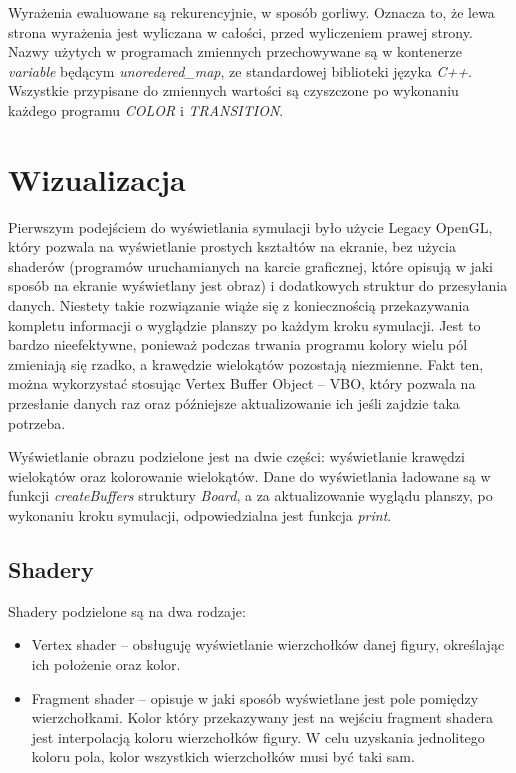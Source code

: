 \documentclass[declaration,shortabstract, inz]{iithesis}
\theoremstyle{definition} \newtheorem{definition}{Definicja}[]
\theoremstyle{plain} \newtheorem{remark}[definition]{Obserwacja}
\theoremstyle{plain} \newtheorem{theorem}[definition]{Twierdzenie}
\theoremstyle{plain} \newtheorem{example}{Przykład}[definition]
\theoremstyle{plain} \newtheorem{lemma}[definition]{Lemat}
\begin{document}
Wyrażenia ewaluowane są rekurencyjnie, w sposób gorliwy. Oznacza to, że lewa strona wyrażenia jest wyliczana w całości, przed wyliczeniem prawej strony. Nazwy użytych w programach zmiennych przechowywane są w kontenerze \textit{variable} będącym \textit{unoredered\_map}, ze standardowej biblioteki języka \textit{C++}. Wszystkie przypisane do zmiennych wartości są czyszczone po wykonaniu każdego programu \textit{COLOR} i \textit{TRANSITION}.

\chapter{Wizualizacja}
\label{sec:openGl}
Pierwszym podejściem do wyświetlania symulacji było użycie Legacy OpenGL, który pozwala na wyświetlanie prostych kształtów na ekranie, bez użycia shaderów (programów uruchamianych na karcie graficznej, które opisują w jaki sposób na ekranie wyświetlany jest obraz) i dodatkowych struktur do przesyłania danych. Niestety takie rozwiązanie wiąże się z koniecznością przekazywania kompletu informacji o wyglądzie planszy po każdym kroku symulacji. Jest to bardzo nieefektywne, ponieważ podczas trwania programu kolory wielu pól zmieniają się rzadko, a krawędzie wielokątów pozostają niezmienne. Fakt ten, można wykorzystać stosując Vertex Buffer Object -- VBO, który pozwala na przesłanie danych raz oraz późniejsze aktualizowanie ich jeśli zajdzie taka potrzeba.

Wyświetlanie obrazu podzielone jest na dwie części: wyświetlanie krawędzi wielokątów oraz kolorowanie wielokątów. Dane do wyświetlania ładowane są w funkcji \textit{createBuffers} struktury \textit{Board}, a za aktualizowanie wyglądu planszy, po wykonaniu kroku symulacji, odpowiedzialna  jest funkcja \textit{print}. 

\section{Shadery}

Shadery podzielone są na dwa rodzaje:
\begin{itemize}

\item Vertex shader -- obsługuję wyświetlanie wierzchołków danej figury, określając ich położenie oraz kolor.
\item Fragment shader -- opisuje w jaki sposób wyświetlane jest pole pomiędzy wierzchołkami. Kolor który przekazywany jest na wejściu fragment shadera jest interpolacją koloru wierzchołków figury. W celu uzyskania jednolitego koloru pola, kolor wszystkich wierzchołków musi być taki sam.

\end{itemize}
\end{document}
